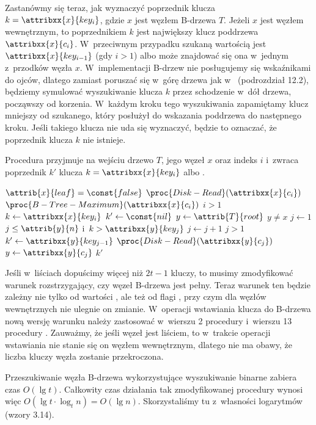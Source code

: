 Zastanówmy się teraz, jak wyznaczyć poprzednik klucza $k=\attribxx{x}{key_i}$, gdzie $x$ jest węzłem B-drzewa $T$.
Jeżeli $x$ jest węzłem wewnętrznym, to poprzednikiem $k$ jest największy klucz poddrzewa $\attribxx{x}{c_i}$.
W~przeciwnym przypadku szukaną wartością jest $\attribxx{x}{key_{i-1}}$ (gdy $i>1$) albo może znajdować się ona w~jednym z~przodków węzła $x$.
W~implementacji B-drzew nie posługujemy się wskaźnikami do ojców, dlatego zamiast poruszać się w~górę drzewa jak w~ (podrozdział 12.2), będziemy symulować wyszukiwanie klucza $k$ przez schodzenie w~dół drzewa, począwszy od korzenia.
W~każdym kroku tego wyszukiwania zapamiętamy klucz mniejszy od szukanego, który posłużył do wskazania poddrzewa do następnego kroku.
Jeśli takiego klucza nie uda się wyznaczyć, będzie to oznaczać, że poprzednik klucza $k$ nie istnieje.

Procedura przyjmuje na wejściu drzewo $T$, jego węzeł $x$ oraz indeks $i$ i~zwraca poprzednik $k'$ klucza $k=\attribxx{x}{key_i}$ albo .
\begin{codebox}
\li \If $\attrib{x}{leaf}=\const{false}$
\li   \Then $\proc{Disk-Read}(\attribxx{x}{c_i})$
\li     \Return $\proc{B-Tree-Maximum}(\attribxx{x}{c_i})$
    \End
\li \If $i>1$
\li   \Then \Return {}
    \End
\li $k\gets\attribxx{x}{key_i}$
\li $k'\gets\const{nil}$
\li $y\gets\attrib{T}{root}$
\li \While $y\ne x$
\li   \Do $j\gets1$
\li   \While $j\le\attrib{y}{n}$ i~$k>\attribxx{y}{key_j}$
\li     \Do $j\gets j+1$
      \End
\li   \If $j>1$
\li     \Then $k'\gets\attribxx{y}{key_{j-1}}$
      \End
\li   $\proc{Disk-Read}(\attribxx{y}{c_j})$
\li   $y\gets\attribxx{y}{c_j}$
    \End
\li \Return $k'$
\end{codebox}

\exercise %
\exercise %
Jeśli w~liściach dopuścimy więcej niż $2t-1$ kluczy, to musimy zmodyfikować warunek rozstrzygający, czy węzeł B-drzewa jest pełny.
Teraz warunek ten będzie zależny nie tylko od wartości , ale też od flagi , przy czym dla węzłów wewnętrznych nie ulegnie on zmianie.
W~operacji wstawiania klucza do B-drzewa nową wersję warunku należy zastosować w~wierszu 2 procedury  i~wierszu 13 procedury .
Zauważmy, że jeśli węzeł jest liściem, to w~trakcie operacji wstawiania nie stanie się on węzłem wewnętrznym, dlatego nie ma obawy, że liczba kluczy węzła zostanie przekroczona.

\exercise %
Przeszukiwanie węzła B-drzewa wykorzystujące wyszukiwanie binarne zabiera czas $O(\lg t)$.
Całkowity czas działania tak zmodyfikowanej procedury  wynosi więc $O(\lg t\cdot\log_tn)=O(\lg n)$.
Skorzystaliśmy tu z~własności logarytmów (wzory 3.14).

